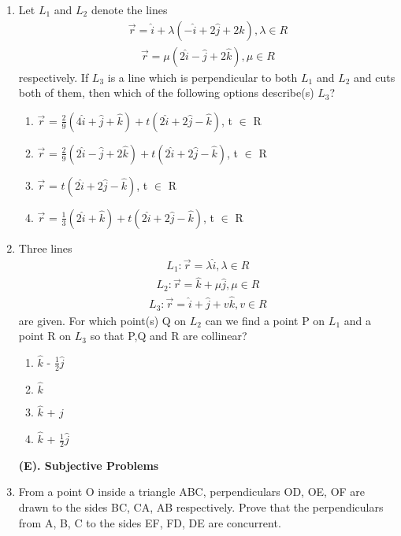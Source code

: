 \begin{enumerate}[label=\arabic*.,ref=\thesubsection.\theenumi]
\item Let $L_1$ and $L_2$ denote the lines 
\begin{align*}
\overrightarrow{r} = \hat{i} + \lambda(-\hat{i} + 2\hat{j} + 2\hat{k}), \lambda \in R
\end{align*}
\begin{align*}
\overrightarrow{r} = \mu(2\hat{i} - \hat{j} + 2\hat{k}), \mu \in R
\end{align*}
respectively. If $L_3$ is a line which is perpendicular to both $L_1$ and $L_2$ and cuts both of them, then which of the following options describe(s) $L_3$?
\begin{enumerate}
\item $\overrightarrow{r}$ = $\frac{2}{9}(4\hat{i} + \hat{j} + \hat{k}) + t(2\hat{i} + 2\hat{j} - \hat{k})$, t $\in$ R
\item $\overrightarrow{r}$ = $\frac{2}{9}(2\hat{i} - \hat{j} + 2\hat{k}) + t(2\hat{i} + 2\hat{j} - \hat{k})$, t $\in$ R
\item $\overrightarrow{r}$ = $t(2\hat{i} + 2\hat{j} - \hat{k})$, t $\in$ R
\item $\overrightarrow{r}$ = $\frac{1}{3}(2\hat{i} + \hat{k}) + t(2\hat{i} + 2\hat{j} - \hat{k})$, t $\in$ R
\end{enumerate}

\item Three lines 
\begin{align*}
L_1: \overrightarrow{r} = \lambda\hat{i}, \lambda \in R
\end{align*}
\begin{align*}
L_2: \overrightarrow{r} = \hat{k} + \mu\hat{j}, \mu \in R
\end{align*}
\begin{align*}
L_3: \overrightarrow{r} = \hat{i} + \hat{j} + v\hat{k}, v \in R
\end{align*}
are given. For which point(s) Q on $L_2$ can we find a point P on $L_1$ and a point R on $L_3$ so that P,Q and R are collinear?
\begin{enumerate}
\item $\hat{k}$ - $\frac{1}{2}\hat{j}$
\item $\hat{k}$
\item $\hat{k}$ + $\hat{j}$
\item $\hat{k}$ + $\frac{1}{2}\hat{j}$
\end{enumerate}

\textbf{(E). Subjective Problems}

\item From a point O inside a triangle ABC, perpendiculars OD, OE, OF are drawn to the sides BC, CA, AB respectively. Prove that the perpendiculars from A, B, C to the sides EF, FD, DE are concurrent.


\end{enumerate}
